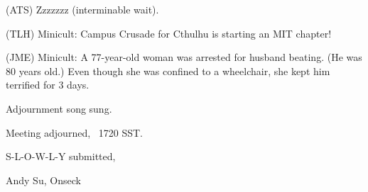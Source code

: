 \documentclass[12pt]{article}
\begin{document}
(ATS) Zzzzzzz (interminable wait).

(TLH) Minicult: Campus Crusade for Cthulhu is starting an MIT chapter!

(JME) Minicult: A 77-year-old woman was arrested for husband beating. (He was 80 years old.) Even though she was confined to a wheelchair, she kept him terrified for 3 days.

Adjournment song sung.

\vspace{12pt}

\noindent
Meeting adjourned, ~1720 SST.

\vspace{18pt}

\centerline{S-L-O-W-L-Y submitted,}
\centerline{Andy Su, Onseck}
\end{document}
